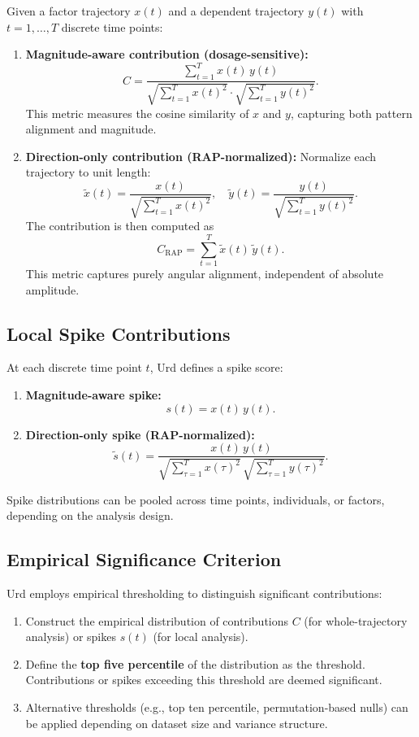 \documentclass{article}
\begin{document}
Given a factor trajectory $x(t)$ and a dependent trajectory $y(t)$ with $t=1,\dots,T$ discrete time points:

\begin{enumerate}
    \item \textbf{Magnitude-aware contribution (dosage-sensitive):}
    \[
        C = \frac{\sum_{t=1}^T x(t) \, y(t)}{\sqrt{\sum_{t=1}^T x(t)^2} \cdot \sqrt{\sum_{t=1}^T y(t)^2}}.
    \]
    This metric measures the cosine similarity of $x$ and $y$, capturing both pattern alignment and magnitude.

    \item \textbf{Direction-only contribution (RAP-normalized):}
    Normalize each trajectory to unit length:
    \[
        \tilde{x}(t) = \frac{x(t)}{\sqrt{\sum_{t=1}^T x(t)^2}}, 
        \quad
        \tilde{y}(t) = \frac{y(t)}{\sqrt{\sum_{t=1}^T y(t)^2}}.
    \]
    The contribution is then computed as
    \[
        C_{\text{RAP}} = \sum_{t=1}^T \tilde{x}(t) \, \tilde{y}(t).
    \]
    This metric captures purely angular alignment, independent of absolute amplitude.
\end{enumerate}

\subsection{Local Spike Contributions}

At each discrete time point $t$, Urd defines a spike score:

\begin{enumerate}
    \item \textbf{Magnitude-aware spike:}
    \[
        s(t) = x(t)\,y(t).
    \]
    \item \textbf{Direction-only spike (RAP-normalized):}
    \[
        \tilde{s}(t) = \frac{x(t)\,y(t)}{\sqrt{\sum_{\tau=1}^T x(\tau)^2}\,\sqrt{\sum_{\tau=1}^T y(\tau)^2}}.
    \]
\end{enumerate}

Spike distributions can be pooled across time points, individuals, or factors, depending on the analysis design.

\subsection{Empirical Significance Criterion}

Urd employs empirical thresholding to distinguish significant contributions:
\begin{enumerate}
    \item Construct the empirical distribution of contributions $C$ (for whole-trajectory analysis) or spikes $s(t)$ (for local analysis).
    \item Define the \textbf{top five percentile} of the distribution as the threshold. Contributions or spikes exceeding this threshold are deemed significant.
    \item Alternative thresholds (e.g., top ten percentile, permutation-based nulls) can be applied depending on dataset size and variance structure.
\end{enumerate}
\end{document}
